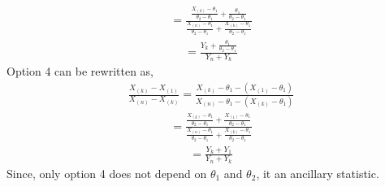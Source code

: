 \documentclass[journal,12pt,twocolumn]{IEEEtran}
\begin{document}
\begin{align}
    =\frac{\frac{X_{(k)}-\theta_{1}}{\theta_{2}-\theta_{1}}+\frac{\theta_{1}}{\theta_{2}-\theta_{1}}}{\frac{X_{(n)}-\theta_{1}}{\theta_{2}-\theta_{1}}+\frac{X_{(k)}-\theta_{1}}{\theta_{2}-\theta_{1}}}
\end{align}
\begin{align}
    =\frac{Y_{k}+\frac{\theta_{1}}{\theta_{2}-\theta_{1}}}{Y_{n}+Y_{k}}
\end{align}
Option 4 can be rewritten as, 
\begin{align}
    \frac{X_{(k)}-X_{(1)}}{X_{(n)}-X_{(k)}} 
    =\frac{X_{(k)}-\theta_{1}-(X_{(1)}-\theta_{1})}{X_{(n)}-\theta_{1}-(X_{(k)}-\theta_{1})}
\end{align}
\begin{align}
    =\frac{\frac{X_{(k)}-\theta_{1}}{\theta_{2}-\theta_{1}}+\frac{X_{(1)}-\theta_{1}}{\theta_{2}-\theta_{1}}}{\frac{X_{(n)}-\theta_{1}}{\theta_{2}-\theta_{1}}+\frac{X_{(k)}-\theta_{1}}{\theta_{2}-\theta_{1}}}
\end{align}
\begin{align}
    =\frac{Y_{k}+Y_{1}}{Y_{n}+Y_{k}}
\end{align}
Since, only option 4 does not depend on $\theta_{1}$ and $\theta_{2}$, it an ancillary statistic.
\end{document}
